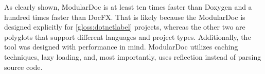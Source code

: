 As clearly shown, ModularDoc is at least ten times faster than Doxygen and a hundred times faster than DocFX.
That is likely because the ModularDoc is designed explicitly for \ref{gloss:dotnetlabel} projects, whereas the other two are polyglots that support different languages and project types.
Additionally, the tool was designed with performance in mind. ModularDoc utilizes caching techniques, lazy loading, and, most importantly, uses reflection instead of parsing source code.